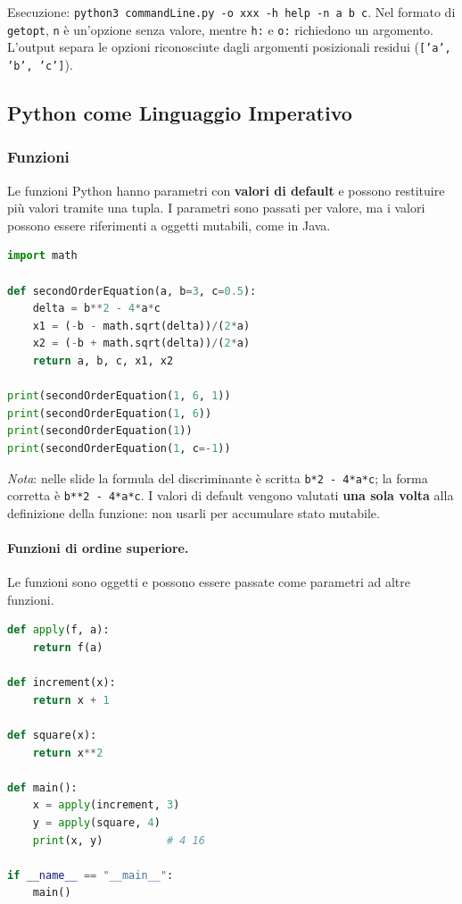 \documentclass[12pt]{extarticle}
\begin{document}
\noindent Esecuzione: \texttt{python3 commandLine.py -o xxx -h help -n a b c}. Nel formato di \texttt{getopt}, \texttt{n} è un'opzione senza valore, mentre \texttt{h:} e \texttt{o:} richiedono un argomento. L'output separa le opzioni riconosciute dagli argomenti posizionali residui (\texttt{['a', 'b', 'c']}).

\subsection{Python come Linguaggio Imperativo}

\subsubsection{Funzioni}

\noindent Le funzioni Python hanno parametri con \textbf{valori di default} e possono restituire più valori tramite una tupla. I parametri sono passati per valore, ma i valori possono essere riferimenti a oggetti mutabili, come in Java.

\begin{lstlisting}[language=Python]
import math

def secondOrderEquation(a, b=3, c=0.5):
    delta = b**2 - 4*a*c
    x1 = (-b - math.sqrt(delta))/(2*a)
    x2 = (-b + math.sqrt(delta))/(2*a)
    return a, b, c, x1, x2

print(secondOrderEquation(1, 6, 1))
print(secondOrderEquation(1, 6))
print(secondOrderEquation(1))
print(secondOrderEquation(1, c=-1))
\end{lstlisting}

\noindent \textit{Nota}: nelle slide la formula del discriminante è scritta \texttt{b*2 - 4*a*c}; la forma corretta è \texttt{b**2 - 4*a*c}. I valori di default vengono valutati \textbf{una sola volta} alla definizione della funzione: non usarli per accumulare stato mutabile.

\paragraph{Funzioni di ordine superiore.} Le funzioni sono oggetti e possono essere passate come parametri ad altre funzioni.

\begin{lstlisting}[language=Python]
def apply(f, a):
    return f(a)

def increment(x):
    return x + 1

def square(x):
    return x**2

def main():
    x = apply(increment, 3)
    y = apply(square, 4)
    print(x, y)          # 4 16

if __name__ == "__main__":
    main()
\end{lstlisting}
\end{document}
